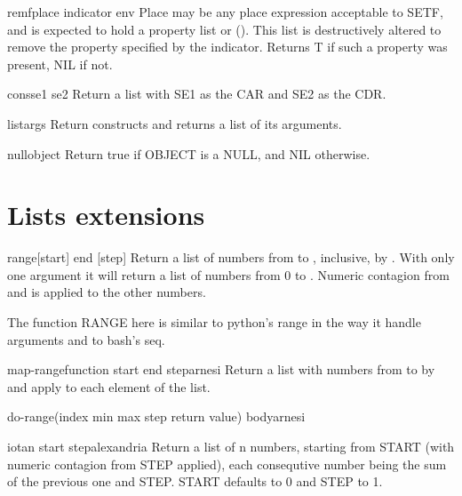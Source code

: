 \begin{macro}{remf}{place indicator \env env}{}{}
  Place may be any place expression acceptable to SETF, and is expected
  to hold a property list or (). This list is destructively altered to
  remove the property specified by the indicator. Returns T if such a
  property was present, NIL if not.
\end{macro}

\begin{class}{cons}{se1 se2}{}{}
  Return a list with SE1 as the CAR and SE2 as the CDR.
\end{class}

\begin{class}{list}{\rest args}{}{}
  Return constructs and returns a list of its arguments.
\end{class}

\begin{class}{null}{object}{}{}
  Return true if OBJECT is a NULL, and NIL otherwise.
\end{class}

\section{Lists extensions}
\label{sec:lists-extensions}

\begin{function}{range}{[start] end [step]}{}{}
  Return a list of numbers from  to , inclusive,
  by . With only one argument it will return a list of
  numbers from 0 to . Numeric contagion from  and
   is applied to the other numbers.
\begin{devnote}
  The function RANGE here is similar to python's range in the way it
  handle arguments and to bash's seq.
\end{devnote}
\end{function}

\begin{function}{map-range}{function start end \op step}{arnesi}{}
  Return a list with numbers from  to  by 
  and apply  to each element of the list.
\end{function}

\begin{macro}{do-range}{(index \op min max step return value) \body body}{arnesi}{}
  
\end{macro}

\begin{function}{iota}{n \key start step}{alexandria}{}
  Return a list of n numbers, starting from START (with numeric
  contagion from STEP applied), each consequtive number being the sum
  of the previous one and STEP. START defaults to 0 and STEP to 1.
\end{function}

